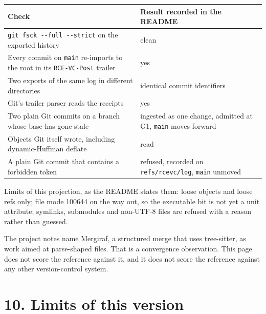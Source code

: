 \documentclass[10pt,letterpaper]{article}
\newcounter{none}
\begin{document}
{\def\LTcaptype{none} %
{\footnotesize\setlength{\tabcolsep}{3.8pt}\renewcommand{\arraystretch}{1.15}
\begin{longtable}[]{@{}
  >{\raggedright\arraybackslash}p{}
  >{\raggedright\arraybackslash}p{}@{}}
\toprule\noalign{}
\begin{minipage}[b]{\linewidth}\raggedright
\textbf{Check}
\end{minipage} & \begin{minipage}[b]{\linewidth}\raggedright
\textbf{Result recorded in the README}
\end{minipage} \\
\midrule\noalign{}
\endhead
\bottomrule\noalign{}
\endlastfoot
\texttt{git\ fsck\ -\allowbreak{}\/\allowbreak{}-\allowbreak{}full\ -\allowbreak{}\/\allowbreak{}-\allowbreak{}strict} on the exported history &
clean \\
Every commit on \texttt{main} re-imports to the root in its
\texttt{RCE-VC-Post} trailer & yes \\
Two exports of the same log in different directories & identical commit
identifiers \\
Git's trailer parser reads the receipts & yes \\
Two plain Git commits on a branch whose base has gone stale & ingested
as one change, admitted at G1, \texttt{main} moves forward \\
Objects Git itself wrote, including dynamic-Huffman deflate & read \\
A plain Git commit that contains a forbidden token & refused, recorded
on \texttt{refs/rcevc/log}, \texttt{main} unmoved \\
\end{longtable}
}
}

Limits of this projection, as the README states them: loose objects and
loose refs only; file mode 100644 on the way out, so the executable bit
is not yet a unit attribute; symlinks, submodules and non-UTF-8 files
are refused with a reason rather than guessed.

The project notes name Mergiraf, a structured merge that uses
tree-sitter, as work aimed at parse-shaped files. That is a convergence
observation. This page does not score the reference against it, and it
does not score the reference against any other version-control system.

\section{10. Limits of this version}\label{limits-of-this-version}
\end{document}
